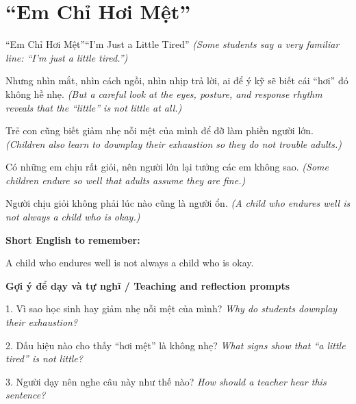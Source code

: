 \section{“Em Chỉ Hơi Mệt”}
\begin{truyen}{“Em Chỉ Hơi Mệt”}{“I’m Just a Little Tired”}
\textit{(Some students say a very familiar line: “I’m just a little tired.”)}

Nhưng nhìn mắt, nhìn cách ngồi, nhìn nhịp trả lời, ai để ý kỹ sẽ biết cái “hơi” đó không hề nhẹ.
\textit{(But a careful look at the eyes, posture, and response rhythm reveals that the “little” is not little at all.)}

Trẻ con cũng biết giảm nhẹ nỗi mệt của mình để đỡ làm phiền người lớn.
\textit{(Children also learn to downplay their exhaustion so they do not trouble adults.)}

Có những em chịu rất giỏi, nên người lớn lại tưởng các em không sao.
\textit{(Some children endure so well that adults assume they are fine.)}

\end{truyen}

\begin{baihoc}
Người chịu giỏi không phải lúc nào cũng là người ổn.
\textit{(A child who endures well is not always a child who is okay.)}
\end{baihoc}

\begin{ghinhoanh}
\textbf{Short English to remember:}

A child who endures well is not always a child who is okay.

\end{ghinhoanh}

\begin{tuhocnhanh}
\textbf{Gợi ý để dạy và tự nghĩ / Teaching and reflection prompts}

1. Vì sao học sinh hay giảm nhẹ nỗi mệt của mình? \textit{Why do students downplay their exhaustion?}

2. Dấu hiệu nào cho thấy “hơi mệt” là không nhẹ? \textit{What signs show that “a little tired” is not little?}

3. Người dạy nên nghe câu này như thế nào? \textit{How should a teacher hear this sentence?}
\end{tuhocnhanh}
\ngancach

